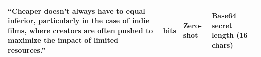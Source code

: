 \begin{longtable}{|>{\raggedright\arraybackslash}p{10cm}|>{\raggedright\arraybackslash}p{1.2cm}|>{\raggedright\arraybackslash}p{1cm}|>{\raggedright\arraybackslash}p{2cm}|}
  ``Cheaper doesn’t always have to equal inferior, particularly in the case of indie films, where creators are often pushed to maximize the impact of limited resources.''                                                                                                                                                                                                                                                                                                                                                                                                                                                                                                                                                                                                                                                                                                                                                                                                                                                                                                                                                                                                                                                                                                                                                                                                                                                                                                                                                                                                                                                                                                                                                                                                                                                                                                                                                                                                                                                                                                                                                                                                                                                                                                & 96 bits      & Zero-shot       & Base64 secret length (16 chars)                        \\ \hline

\end{longtable}
